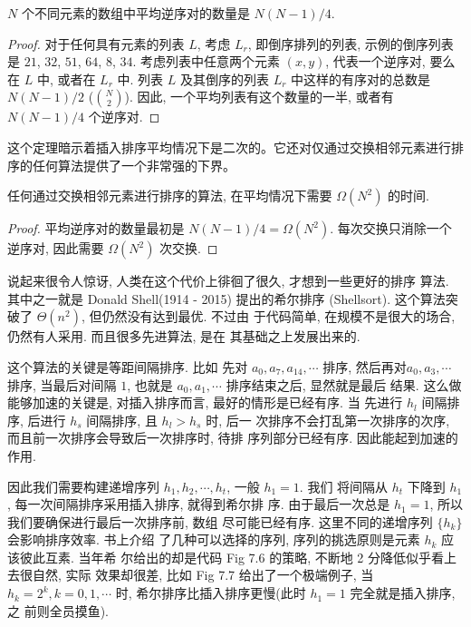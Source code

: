 \documentclass[a4paper]{ctexart}
\newcommand{\hl}[1]
{\noindent {\bf {#1}}}
\theoremstyle{definition}
\theoremstyle{definition}
\begin{document}
\hl{定理 7.1} $N$ 个不同元素的数组中平均逆序对的数量是 $N(N - 1)/4$.

\begin{proof}
对于任何具有元素的列表 $L$, 考虑 $L_r$, 即倒序排列的列表, 
示例的倒序列表是 $21$, $32$, $51$, $64$, $8$, $34$. 
考虑列表中任意两个元素 $(x, y)$, 代表一个逆序对, 要么在 $L$ 中, 或者在 $L_r$ 中.  
列表 $L$ 及其倒序的列表 $L_r$ 中这样的有序对的总数是 $N(N - 1)/2$ 
($N \choose 2$). 
因此, 一个平均列表有这个数量的一半, 或者有 $N(N - 1)/4$ 个逆序对.   
\end{proof}

这个定理暗示着插入排序平均情况下是二次的。它还对仅通过交换相邻元素进行排序的任何算法提供了一个非常强的下界。

\hl{定理 7.2} 任何通过交换相邻元素进行排序的算法, 在平均情况下需要 $\Omega(N^2)$ 
的时间. 

\begin{proof}
平均逆序对的数量最初是 $N(N - 1)/4 = \Omega(N^2)$. 每次交换只消除一个逆序对, 
因此需要 $\Omega(N^2)$ 次交换.
\end{proof}  

说起来很令人惊讶, 人类在这个代价上徘徊了很久, 才想到一些更好的排序
算法. 其中之一就是 Donald Shell(1914 - 2015) 提出的希尔排序
(Shellsort). 这个算法突破了 $\Theta(n^2)$, 但仍然没有达到最优. 不过由
于代码简单, 在规模不是很大的场合, 仍然有人采用. 而且很多先进算法, 是在
其基础之上发展出来的.

 这个算法的关键是等距间隔排序. 比如
先对 $a_0, a_7, a_{14}, \cdots$ 排序, 然后再对$a_0, a_3, \cdots$ 排序,
当最后对间隔 $1$, 也就是 $a_0, a_1, \cdots$ 排序结束之后, 显然就是最后
结果. 这么做能够加速的关键是, 对插入排序而言, 最好的情形是已经有序. 当
先进行 $h_l$ 间隔排序, 后进行 $h_s$ 间隔排序, 且 $h_l > h_s$ 时, 后一
次排序不会打乱第一次排序的次序, 而且前一次排序会导致后一次排序时, 待排
序列部分已经有序. 因此能起到加速的作用.

因此我们需要构建递增序列 $h_1, h_2, \cdots, h_t$, 一般 $h_1 = 1$. 我们
将间隔从 $h_t$ 下降到 $h_1$, 每一次间隔排序采用插入排序, 就得到希尔排
序. 由于最后一次总是 $h_1 = 1$, 所以我们要确保进行最后一次排序前, 数组
尽可能已经有序. 这里不同的递增序列 $\{h_k\}$ 会影响排序效率. 书上介绍
了几种可以选择的序列, 序列的挑选原则是元素 $h_k$ 应该彼此互素. 当年希
尔给出的却是代码 Fig 7.6 的策略, 不断地 2 分降低似乎看上去很自然, 实际
效果却很差, 比如 Fig 7.7 给出了一个极端例子, 当 $h_k = 2^k, k = 0, 1,
\cdots$ 时, 希尔排序比插入排序更慢(此时 $h_1 = 1$ 完全就是插入排序, 之
前则全员摸鱼).
\end{document}
